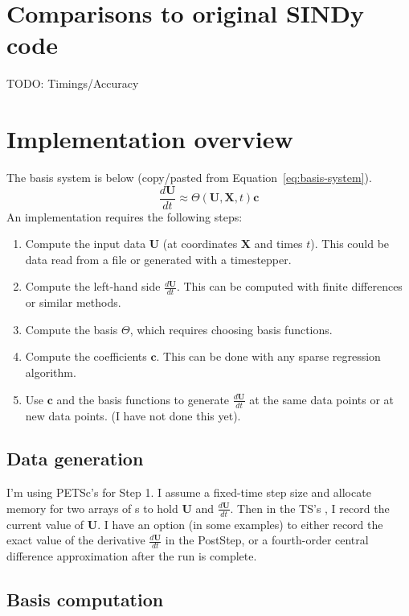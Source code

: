 \documentclass{article}
\let\vec\mathbf
\def\lstinline#1{}%
\begin{document}
\section{Comparisons to original SINDy code}

TODO: Timings/Accuracy


\section{Implementation overview}

The basis system is below (copy/pasted from Equation~\ref{eq:basis-system}).
\begin{equation}
\frac{d\vec{U}}{dt} \approx \Theta(\vec{U}, \vec{X}, t) \vec{c}
\end{equation}
An implementation requires the following steps:
\begin{enumerate}
    \item Compute the input data $\vec{U}$ (at coordinates $\vec{X}$ and times $t$). This could be data read from a file or generated with a timestepper.
    \item Compute the left-hand side $\frac{d\vec{U}}{dt}$. This can be computed with finite differences or similar methods.
    \item Compute the basis $\Theta$, which requires choosing basis functions.
    \item Compute the coefficients $\vec{c}$. This can be done with any sparse regression algorithm.
    \item Use $\vec{c}$ and the basis functions to generate $\frac{d\vec{U}}{dt}$ at the same data points or at new data points. (I have not done this yet).
\end{enumerate}

\subsection{Data generation}

I'm using PETSc's \lstinline{TS} for Step 1. I assume a fixed-time step size and
allocate memory for two arrays of \lstinline{Vec}s to hold $\vec{U}$ and
$\frac{d\vec{U}}{dt}$. Then in the TS's \lstinline{PostStep}, I record the
current value of $\vec{U}$. I have an option (in some examples) to either record
the exact value of the derivative $\frac{d\vec{U}}{dt}$ in the PostStep, or a
fourth-order central difference approximation after the run is complete.


\subsection{Basis computation}
\end{document}
